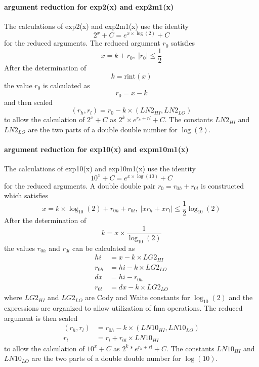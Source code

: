 \documentclass[10pt,a4paper,final,oneside]{article}
\numberwithin{equation}{subsection}
\begin{document}
\paragraph{argument reduction for exp2(x) and exp2m1(x)}

    The calculations of exp2(x) and exp2m1(x) use the
    identity
    \begin{equation}
        2^x + C = e^{x \times \log{(2)}} + C
    \end{equation}
    for the reduced arguments.
    The reduced argument $ r_0 $ satisfies
    \begin{equation}
        x = k + r_0, \;
        |r_0| \le \frac{1}{2}
    \end{equation}
    After the determination of
    \[
        k = \text{rint}(x)
    \]
    the value $r_0$ is calculated as
    \[
       r_0 = x - k
    \]
    and then scaled
    \[
       (r_h, r_l) = r_0 - k \times (LN2_{HI}, LN2_{LO})
    \]
    to allow the calculation of $ 2^x + C $ as $ 2^k \times e^{r_h+ rl} + C$.
    The constants $LN2_{HI}$ and $LN2_{LO}$ are the two parts of a double double number for $\log{(2)}$.

\paragraph{argument reduction for exp10(x) and expm10m1(x)}

    The calculations of exp10(x) and exp10m1(x) use the
    identity
    \begin{equation}
        10^x + C = e^{x \times \log{(10)}} + C
    \end{equation}
    for the reduced arguments. A  double double pair $ r_0= r_{0h} + r_{0l} $ is constructed which satisfies
    \begin{equation}
        x = k \times \log_{10}{(2)} + r_{0h} + r_{0l}, \;
        |xr_h +xr_l| \le \frac{1}{2} \log_{10}{(2)}
    \end{equation}
    After the determination of
    \[
        k = x \times \frac{1}{\log_{10}{(2)}}
    \]
    the values $r_{0h}$ and $r_{0l}$ can be calculated as
    \[
       \begin{aligned}
       hi &= x - k \times LG2_{HI} \\
       r_{0h} &= hi - k \times LG2_{LO} \\
       dx & = hi - r_{0h} \\
       r_{0l} &= dx - k \times LG2_{LO}
       \end{aligned}
    \]
    where $LG2_{HI}$ and $LG2_{LO}$ are Cody and Waite constants for
    $\log_{10}{(2)}$
    and the expressions are organized to allow utilization of fma operations.
    The reduced argument is then scaled
    \[
        \begin{aligned}
        (r_h, r_l) &= r_{0h} - k \times (LN10_{HI}, LN10_{LO}) \\
        r_l &= r_l + r_{0l} \times LN10_{HI}
        \end{aligned}
    \]
    to allow the calculation of $ 10^x + C $ as $ 2^k * e^{r_h+ rl} + C$.
    The constants $LN10_{HI}$ and $LN10_{LO}$ are the two parts of a double double number for $\log(10)$.
\end{document}
